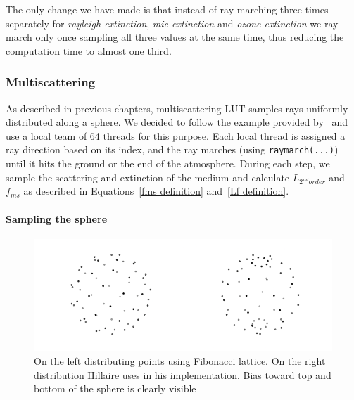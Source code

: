 \documentclass{ctuthesis}
\begin{document}
The only change we have made is that instead of ray marching three times separately for
\textit{rayleigh extinction}, \textit{mie extinction} and \textit{ozone extinction} we
ray march only once sampling all three values at the same time, thus reducing the 
computation time to almost one third.

\subsubsection{Multiscattering}
As described in previous chapters, multiscattering LUT samples rays uniformly distributed along a sphere.
We decided to follow the example provided by~\cite{hillaire_2020} and use a local team
of 64 threads for this purpose. Each local thread is assigned a ray direction based on its
index, and the ray marches (using \verb|raymarch(...)|) until it hits the ground or the end of the
atmosphere. During each step, we sample the scattering and extinction of the medium and
calculate $L_{2^{nd}order}$ and $f_{ms}$ as described in Equations~\ref{fms definition}
and~\ref{Lf definition}.

\paragraph{Sampling the sphere}
\begin{figure}
        \includegraphics[width=1.0\textwidth]{media/Fibonacci_lattice_vs_Hillaire.png}
        \caption[Fibonacci lattice vs uniform sampling]{On the left distributing points using Fibonacci lattice. On the right
            distribution Hillaire uses in his implementation. Bias toward top and 
            bottom of the sphere is clearly visible}
        \label{fig:fibbonaci vs hill sphere}
\end{figure}
\end{document}
